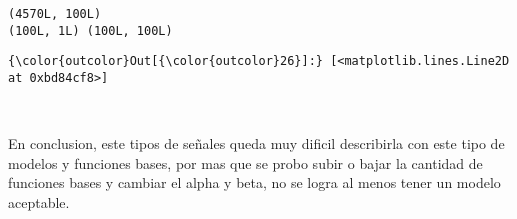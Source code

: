 \documentclass[11pt]{article}
\begin{document}
    \begin{Verbatim}[commandchars=\\\{\}]
(4570L, 100L)
(100L, 1L) (100L, 100L)

    \end{Verbatim}

\begin{Verbatim}[commandchars=\\\{\}]
{\color{outcolor}Out[{\color{outcolor}26}]:} [<matplotlib.lines.Line2D at 0xbd84cf8>]
\end{Verbatim}
            
    \begin{center}
    \end{center}
    { \hspace*{\fill} \\}
    
    En conclusion, este tipos de señales queda muy dificil describirla con
este tipo de modelos y funciones bases, por mas que se probo subir o
bajar la cantidad de funciones bases y cambiar el alpha y beta, no se
logra al menos tener un modelo aceptable.


    
    
    
    
\end{document}
